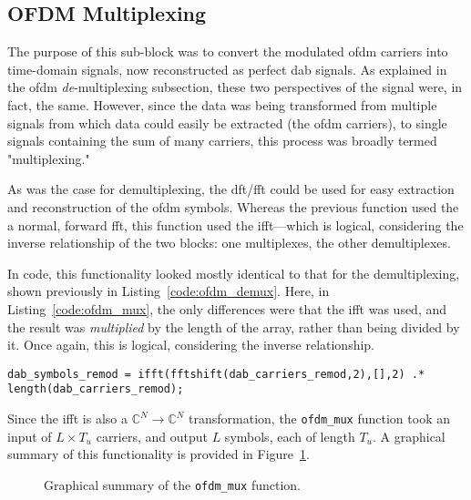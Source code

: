 \documentclass[class=report,11pt,crop=false]{standalone}
\begin{document}
\subsection{OFDM Multiplexing \label{subsect:dab-proc_ofdm-mux}}
The purpose of this sub-block was to convert the modulated \gls{ofdm} carriers into time-domain signals, now reconstructed as perfect \gls{dab} signals. As explained in the \gls{ofdm} \emph{de}-multiplexing subsection, these two perspectives of the signal were, in fact, the same. However, since the data was being transformed from multiple signals from which data could easily be extracted (the \gls{ofdm} carriers), to single signals containing the sum of many carriers, this process was broadly termed "multiplexing."

As was the case for demultiplexing, the \gls{dft}/\gls{fft} could be used for easy extraction and reconstruction of the \gls{ofdm} symbols. Whereas the previous function used the a normal, forward \gls{fft}, this function used the \gls{ifft}---which is logical, considering the inverse relationship of the two blocks: one multiplexes, the other demultiplexes.

In code, this functionality looked mostly identical to that for the demultiplexing, shown previously in Listing~\ref{code:ofdm_demux}. Here, in Listing~\ref{code:ofdm_mux}, the only differences were that the \gls{ifft} was used, and the result was \emph{multiplied} by the length of the array, rather than being divided by it. Once again, this is logical, considering the inverse relationship.

\begin{lstlisting}[caption={MATLAB code for multiplexing an \gls{ofdm} symbol}, label={code:ofdm_mux}]
dab_symbols_remod = ifft(fftshift(dab_carriers_remod,2),[],2) .* length(dab_carriers_remod);
\end{lstlisting}

Since the \gls{ifft} is also a \(\mathbb{C}^N \to \mathbb{C}^N\) transformation, the \texttt{ofdm\_mux} function took an input of \(L\times T_u\) carriers, and output \(L\) symbols, each of length \(T_u\). A graphical summary of this functionality is provided in Figure~\ref{fig:ofdm_mux}.

\begin{figure}[htbp]
  \centering
  \captionsetup{type=figure}
  \def\svgwidth{\linewidth}
  { %
  }
  \caption{Graphical summary of the \texttt{ofdm\_mux} function.}
  \label{fig:ofdm_mux}
\end{figure}
\end{document}
